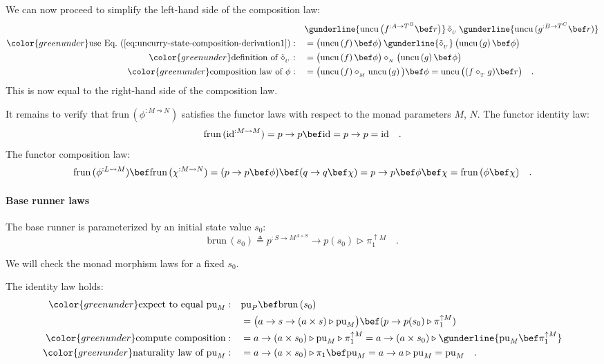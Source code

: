We can now proceed to simplify the left-hand side of the composition
law:
\begin{align*}
 & \gunderline{\text{uncu}\,\big(f^{:A\rightarrow T^{B}}\bef r\big)}\,\tilde{\diamond}_{_{U}}\,\gunderline{\text{uncu}\,(g^{:B\rightarrow T^{C}}\bef r)}\\
{\color{greenunder}\text{use Eq.~(\ref{eq:uncurry-state-composition-derivation1})}:}\quad & =\big(\text{uncu}\left(f\right)\bef\phi\big)\,\gunderline{\tilde{\diamond}_{_{U}}}\,\big(\text{uncu}\left(g\right)\bef\phi\big)\\
{\color{greenunder}\text{definition of }\tilde{\diamond}_{_{U}}:}\quad & =\big(\text{uncu}\left(f\right)\bef\phi\big)\diamond_{_{N}}\big(\text{uncu}\left(g\right)\bef\phi\big)\\
{\color{greenunder}\text{composition law of }\phi:}\quad & =\big(\text{uncu}\left(f\right)\diamond_{_{M}}\text{uncu}\left(g\right)\big)\bef\phi=\text{uncu}\,\big((f\diamond_{_{T}}g)\bef r\big)\quad.
\end{align*}
This is now equal to the right-hand side of the composition law.

It remains to verify that $\text{frun}\,(\phi^{:M\leadsto N})$ satisfies
the functor laws with respect to the monad parameters $M$, $N$.
The functor identity law:
\[
\text{frun}\,(\text{id}^{:M\leadsto M})=p\rightarrow p\bef\text{id}=p\rightarrow p=\text{id}\quad.
\]
The functor composition law:
\[
\text{frun}\,(\phi^{:L\leadsto M})\bef\text{frun}\,(\chi^{:M\leadsto N})=(p\rightarrow p\bef\phi)\bef(q\rightarrow q\bef\chi)=p\rightarrow p\bef\phi\bef\chi=\text{frun}\,(\phi\bef\chi)\quad.
\]


\paragraph{Base runner laws}

The base runner is parameterized by an initial state value $s_{0}$:
\[
\text{brun}\,(s_{0})\triangleq p^{:S\rightarrow M^{A\times S}}\rightarrow p(s_{0})\triangleright\pi_{1}^{\uparrow M}\quad.
\]

We will check the monad morphism laws for a fixed $s_{0}$. 

The identity law holds:
\begin{align*}
{\color{greenunder}\text{expect to equal }\text{pu}_{M}:}\quad & \text{pu}_{P}\bef\text{brun}\,(s_{0})\\
 & =\big(a\rightarrow s\rightarrow(a\times s)\triangleright\text{pu}_{M}\big)\bef(p\rightarrow p(s_{0})\triangleright\pi_{1}^{\uparrow M})\\
{\color{greenunder}\text{compute composition}:}\quad & =a\rightarrow(a\times s_{0})\triangleright\text{pu}_{M}\triangleright\pi_{1}^{\uparrow M}=a\rightarrow(a\times s_{0})\triangleright\gunderline{\text{pu}_{M}\bef\pi_{1}^{\uparrow M}}\\
{\color{greenunder}\text{naturality law of }\text{pu}_{M}:}\quad & =a\rightarrow(a\times s_{0})\triangleright\pi_{1}\bef\text{pu}_{M}=a\rightarrow a\triangleright\text{pu}_{M}=\text{pu}_{M}\quad.
\end{align*}

